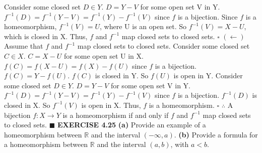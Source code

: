 \documentclass[12pt]{article}
\begin{document}
\newline \newline
Consider some closed set \(D \in Y\).
\newline
\(D = Y - V\) for some open set V in Y.
\newline
\(f^{-1}(D) = f^{-1}(Y-V) = f^{-1}(Y) - f^{-1}(V)\) since \(f\) is a bijection.
\newline
Since \(f\) is a homeomorphism, \(f^{-1}(V) = U\), where U is an open set.
\newline
So \(f^{-1}(V) = X - U\), which is closed in X.
\newline
Thus, \(f\) and \(f^{-1}\) map closed sets to closed sets.
\newline \(\square\) \newline
\((\leftarrow)\) Assume that \(f\) and \(f^{-1}\) map closed sets to closed sets.
\newline
Consider some closed set \(C \in X\).
\newline
\(C = X - U\) for some open set U in X.
\newline
\(f(C) = f(X-U) = f(X) - f(U)\) since \(f\) is a bijection.
\newline
\(f(C) = Y - f(U)\).
\newline
\(f(C)\) is closed in Y.
\newline
So \(f(U)\) is open in Y.
\newline
Consider some closed set \(D \in Y\).
\newline
\(D = Y - V\) for some open set V in Y.
\newline
\(f^{-1}(D) = f^{-1}(Y - V) = f^{-1}(Y) - f^{-1}(V)\) since \(f\) is a bijection.
\newline
\(f^{-1}(D)\) is closed in X.
\newline
So \(f^{-1}(V)\) is open in X.
\newline
Thus, \(f\) is a homeomorphism.
\newline \(\square\) \newline
\(\therefore\) A bijection \(f: X \rightarrow Y\) is a homeomorphism if and only if \(f\) and \(f^{-1}\) map closed sets to closed sets.
\newline \(\blacksquare\)
\newpage
\noindent
\textbf{EXERCISE 4.25}
\newline
\textbf{(a)} Provide an example of a homeomorphism between \(\mathbb{R}\) and the interval \((-\infty, a)\).
\newline
\textbf{(b)} Provide a formula for a homeomorphism between \(\mathbb{R}\) and the interval \((a,b)\), with \(a < b\).
\end{document}
